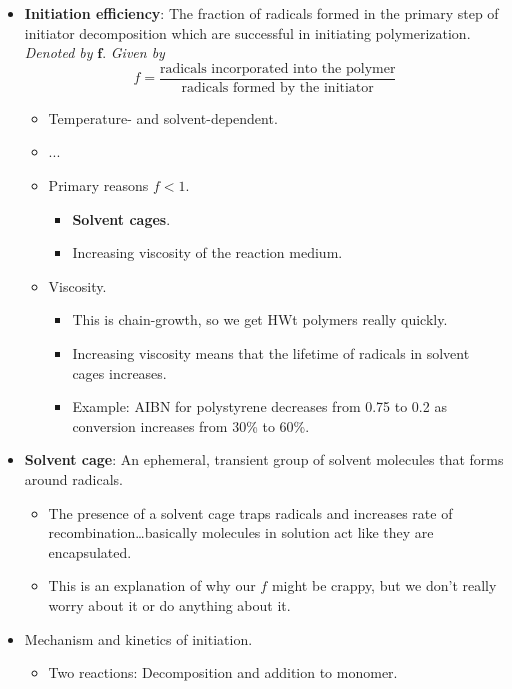 \documentclass[../notes.tex]{subfiles}
\begin{document}
\begin{itemize}
    \item \textbf{Initiation efficiency}: The fraction of radicals formed in the primary step of initiator decomposition which are successful in initiating polymerization. \emph{Denoted by} $\bm{f}$. \emph{Given by}
    \begin{equation*}
        f = \frac{\text{radicals incorporated into the polymer}}{\text{radicals formed by the initiator}}
    \end{equation*}
    \begin{itemize}
        \item Temperature- and solvent-dependent.
        \item ...
        \item Primary reasons $f<1$.
        \begin{itemize}
            \item \textbf{Solvent cages}.
            \item Increasing viscosity of the reaction medium.
        \end{itemize}
        \item Viscosity.
        \begin{itemize}
            \item This is chain-growth, so we get HWt polymers really quickly.
            \item Increasing viscosity means that the lifetime of radicals in solvent cages increases.
            \item Example: AIBN for polystyrene decreases from 0.75 to 0.2 as conversion increases from 30\% to 60\%.
        \end{itemize}
    \end{itemize}
    \item \textbf{Solvent cage}: An ephemeral, transient group of solvent molecules that forms around radicals.
    \begin{itemize}
        \item The presence of a solvent cage traps radicals and increases rate of recombination\dots basically molecules in solution act like they are encapsulated.
        \item This is an explanation of why our $f$ might be crappy, but we don't really worry about it or do anything about it.
    \end{itemize}
    \item Mechanism and kinetics of initiation.
    \begin{itemize}
        \item Two reactions: Decomposition and addition to monomer.

\end{itemize}
\end{itemize}
\end{document}

